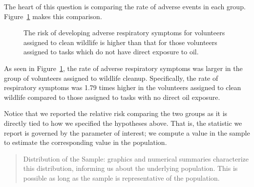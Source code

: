 \documentclass[
  letterpaper,
  DIV=11,
  numbers=noendperiod]{scrreprt}
\theoremstyle{plain}
\theoremstyle{definition}
\theoremstyle{definition}
\theoremstyle{remark}
\begin{document}
The heart of this question is comparing the rate of adverse events in
each group. Figure~\ref{fig-recaplanguage-deepwater-plot} makes this
comparison.

\begin{figure}


\caption{\label{fig-recaplanguage-deepwater-plot}The risk of developing
adverse respiratory symptoms for volunteers assigned to clean wildlife
is higher than that for those volunteers assigned to tasks which do not
have direct exposure to oil.}

\end{figure}%

As seen in Figure~\ref{fig-recaplanguage-deepwater-plot}, the rate of
adverse respiratory symptoms was larger in the group of volunteers
assigned to wildlife cleanup. Specifically, the rate of respiratory
symptoms was 1.79 times higher in the volunteers assigned to clean
wildlife compared to those assigned to tasks with no direct oil
exposure.

Notice that we reported the relative risk comparing the two groups as it
is directly tied to how we specified the hypotheses above. That is, the
statistic we report is governed by the parameter of interest; we compute
a value in the sample to estimate the corresponding value in the
population.

\begin{quote}
Distribution of the Sample: graphics and numerical summaries
characterize this distribution, informing us about the underlying
population. This is possible as long as the sample is representative of
the population.
\end{quote}
\end{document}
